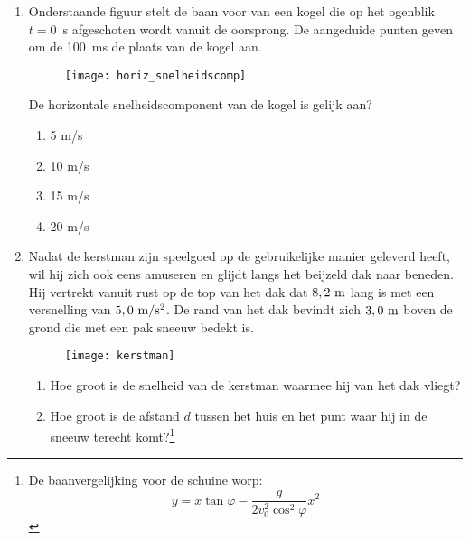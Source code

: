 \documentclass{ximera}
\begin{document}
\begin{enumerate}
\item Onderstaande figuur stelt de baan voor van
een kogel die op het ogenblik \mbox{$t=0$~s} afgeschoten wordt
vanuit de oorsprong. De aangeduide punten geven om de \mbox{100 ms}
de plaats van de kogel aan.
\begin{figure}[h]
\begin{center}
\texttt{[image: horiz\_snelheidscomp]}
\end{center}
\end{figure}


De horizontale snelheidscomponent van de kogel is gelijk aan?
\begin{enumerate}
\item 5 m/s
\item 10 m/s
\item 15 m/s
\item 20 m/s
\end{enumerate}

\item Nadat de kerstman zijn speelgoed op de
gebruikelijke manier geleverd heeft, wil hij zich ook eens amuseren
en glijdt langs het beijzeld dak naar beneden. Hij vertrekt vanuit
rust op de top van het dak dat $8,2~\rm m$ lang is met een
versnelling van $5,0~\rm m/s^2$. De rand van het dak bevindt zich
$3,0~\rm m$ boven de grond die met een pak sneeuw bedekt is.
\begin{figure}[h]
\begin{center}
\texttt{[image: kerstman]}
\end{center}
\end{figure}
\begin{enumerate}
\item Hoe groot is de snelheid van de kerstman waarmee hij van het
dak vliegt?
\item Hoe groot is de afstand $d$ tussen het huis en het punt waar
hij in de sneeuw terecht komt?\footnote{De baanvergelijking voor de
schuine worp:
\[
y=x\tan\varphi-\frac{g}{2v_0^2\cos^2\varphi}x^2
\]}
\end{enumerate}




\end{enumerate}
\end{document}
